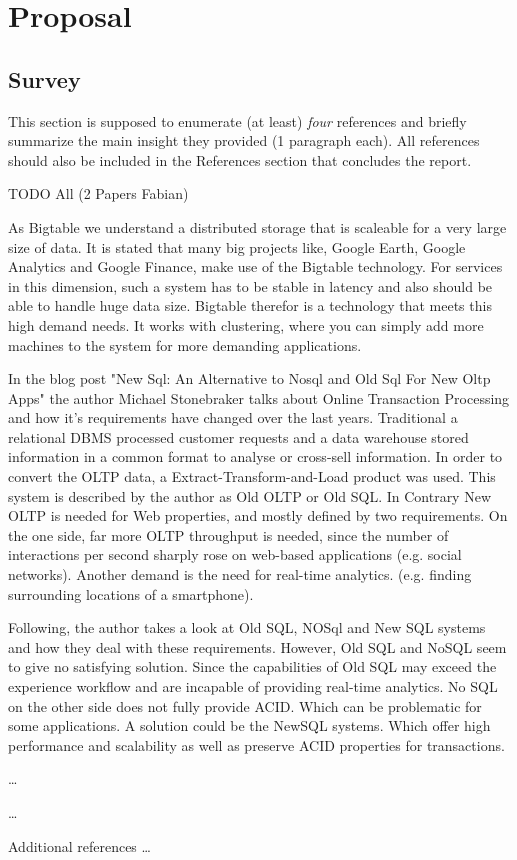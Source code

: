 \section{Proposal}

\subsection{Survey}

This section is supposed to enumerate (at least) \emph{four} references and
briefly summarize the main insight they provided (1 paragraph each). All
references should also be included in the References section that concludes the
report.

TODO All (2 Papers Fabian)

\begin{packed_enum}
   \item
As Bigtable we understand a distributed storage that is scaleable for a very large size of data. It is stated that many big projects like, Google Earth, Google Analytics and Google Finance, make use of the Bigtable technology. For services in this dimension, such a system has to be stable in latency and also should be able to handle huge data size. Bigtable therefor is a technology that meets this high demand needs. It works with clustering, where you can simply add more machines to the system for more demanding applications.  \cite{bigTable}
   \item 
In the blog post "New Sql: An Alternative to Nosql and Old Sql For New Oltp Apps" the author Michael Stonebraker talks about Online
Transaction Processing and how it's requirements have changed over the last years.
Traditional a relational DBMS processed customer requests and a data warehouse stored 
information in a common format to analyse or cross-sell information. In order to convert the OLTP data, a Extract-Transform-and-Load product was used. This system is described by the author as Old OLTP or Old SQL. 
In Contrary New OLTP is needed for Web properties, and mostly defined by two requirements.
On the one side, far more OLTP throughput is needed, since the number of interactions per second
sharply rose on web-based applications (e.g. social networks). Another demand is the need for
real-time analytics. (e.g. finding surrounding locations of a smartphone).

Following, the author takes a look at Old SQL, NOSql and New SQL systems and how they deal with these requirements.
However, Old SQL and NoSQL seem to give no satisfying solution. Since the capabilities of Old
SQL may exceed the experience workflow and are incapable of providing real-time analytics.
No SQL on the other side does not fully provide ACID. Which can be problematic for some applications.
A solution could be the NewSQL systems. Which offer high performance and scalability as well as preserve ACID properties for transactions.

   \item \ldots
   \item \ldots
   \item Additional references \ldots
\end{packed_enum}

